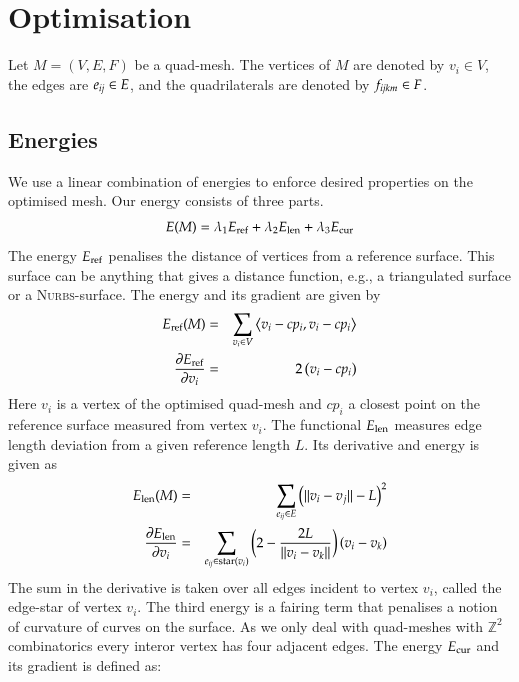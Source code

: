 \documentclass[Thesis.tex]{subfiles}
\begin{document}
\section{Optimisation}

Let $M=(V,E,F)$ be a quad-mesh. The vertices of $M$ are denoted by $v_i \in V$, the edges
are $e_{\mathrm{\it{ij}}} \in E$, and the quadrilaterals are denoted by $f_{\mathrm{\it{ijkm}}} \in F$.
\subsection{Energies}
We use a linear combination of energies to enforce desired properties on the optimised mesh.
Our energy consists of three parts.
\begin{equation}
	E(M) =	\lambda_1 E_{\textrm{\scriptsize{ref}}} + 
		\lambda_2 E_{\textrm{\scriptsize{len}}} +
		\lambda_3 E_{\textrm{\scriptsize{cur}}}
	\label{eq:energy_combination}
\end{equation}
The energy $E_{\textrm{\scriptsize{ref}}}$ penalises the distance of vertices from a
reference surface. This surface can be anything that gives a distance function, e.g., a
triangulated surface or a \textsc{Nurbs}-surface. The energy and its gradient are given 
by
\begin{eqnarray*}
	E_{\textrm{\scriptsize{ref}}}(M) &=& 
	\sum_{v_i \in V}\left<v_i - cp_i, v_i - cp_i\right> \\
	\frac{\partial E_\textrm{\scriptsize{ref}}}{\partial v_i} &=&
	2\left(v_i - cp_i\right)
	\label{eq:energy_reference}
\end{eqnarray*}
Here $v_i$ is a vertex of the optimised quad-mesh and $cp_i$ a closest point on the reference
surface measured from vertex $v_i$. The functional $E_{\textrm{\scriptsize{len}}}$ measures
edge length deviation from a given reference length $L$. Its derivative and energy is given as
\begin{eqnarray*}
	E_{\textrm{\scriptsize{len}}}(M) &=& 
	\sum_{e_{\mathrm{\it{ij}}} \in E} \left(\Vert v_i - v_j \Vert - L\right)^2\\
	\frac{\partial E_\textrm{\scriptsize{len}}}{\partial v_i} &=& 
	\sum_{e_{\mathrm{\it{ij}}} \in \textrm{\scriptsize{star}}(v_i)}
	\left(2 - \frac{2L}{\Vert v_i - v_k \Vert}\right)\left(v_i - v_k \right)
\end{eqnarray*}
The sum in the derivative is taken over all edges incident to vertex $v_i$, called the 
edge-star of vertex $v_i$. The third energy is a fairing term that penalises a notion of
curvature of curves on the surface. As we only deal with quad-meshes with $\mathbb Z^2$ combinatorics every interor vertex has four adjacent edges. The energy $E_{\textrm{\scriptsize{cur}}}$ and its gradient is defined as:
\end{document}
